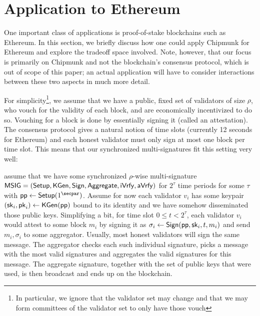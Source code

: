 \section{Application to Ethereum}\label{sec:ethereum}


One important class of applications is proof-of-stake blockchains such as Ethereum. %
In this section, we briefly discuss how one could apply Chipmunk for Ethereum and explore the tradeoff space involved.
Note, however, that our focus is primarily on Chipmunk and not the blockchain's consensus protocol, which is out of scope of this paper;
an actual application will have to consider interactions between these two aspects in much more detail.

For simplicity\footnote{In particular, we ignore that the validator set may change and that we may form committees of the validator set to only have those vouch}, we assume that we have a public, fixed set of validators of size $\rho$, who vouch for the validity of each block, and are economically incentivized to do so.
Vouching for a block is done by essentially signing it (called an attestation). The consensus protocol gives a natural notion of time slots (currently 12 seconds for Ethereum) and each honest validator must only sign at most one block per time slot. This means that our synchronized multi-signatures fit this setting very well:

assume that we have some synchronized $\rho$-wise multi-signature $\mathsf{MSIG} = (\mathsf{Setup}, \mathsf{KGen}, \mathsf{Sign}, \allowbreak \mathsf{Aggregate},\allowbreak \mathsf{iVrfy}, \mathsf{aVrfy})$ for $2^{\tau}$ time periods for some $\tau$ with $\params\gets\setup(1^{\secpar})$. Assume for now each validator $v_i$ has some keypair $(\mathsf{sk}_i,\mathsf{pk}_i)\gets \mathsf{KGen}(\mathsf{pp})$ bound to its identity and we have somehow disseminated those public keys.
Simplifying a bit, for time slot $0\leq t <2^\tau$, each validator $v_i$ would attest to some block $m_i$ by signing it as $\sigma_i\gets\mathsf{Sign}(\mathsf{pp},\mathsf{sk}_i,t,m_i)$ and send $m_i, \sigma_i$ to some aggregator. Usually, most honest validators will sign the same message. The aggregator checks each such individual signature, picks a message with the most valid signatures and aggregates the valid signatures for this message. The aggregate signature, together with the set of public keys that were used, is then broadcast and ends up on the blockchain.

